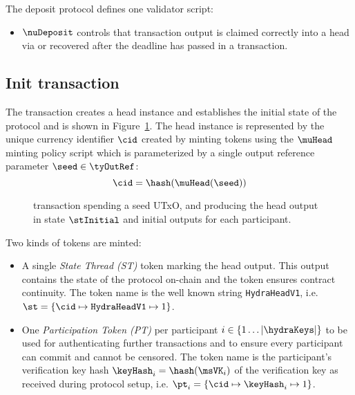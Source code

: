 \noindent The deposit protocol defines one validator script:
  \begin{itemize}
	\item $\nuDeposit$ controls that \mtxDeposit{} transaction output is
	claimed correctly into a head via \mtxIncrement{} or recovered after
	the deadline has passed in a \mtxRecover{} transaction.
  \end{itemize}

\subsection{Init transaction}\label{sec:init-tx}

The \mtxInit{} transaction creates a head instance and establishes the initial
state of the protocol and is shown in Figure~\ref{fig:initTx}. The head
instance is represented by the unique currency identifier $\cid$ created by
minting tokens using the $\muHead$ minting policy script which is parameterized
by a single output reference parameter $\seed \in \tyOutRef$:
\[
  \cid = \hash(\muHead(\seed))
\]

\begin{figure}
  \centering
  
  \caption{\mtxInit{} transaction spending a seed UTxO, and producing the head
	output in state $\stInitial$ and initial outputs for each participant.}\label{fig:initTx}
\end{figure}

\noindent Two kinds of tokens are minted:
\begin{itemize}
  \item A single \emph{State Thread (ST)} token marking the head output. This
  output contains the state of the protocol on-chain and the token ensures
  contract continuity. The token name is the well known string
  \texttt{HydraHeadV1}, i.e.
  $\st = \{\cid \mapsto \texttt{HydraHeadV1} \mapsto 1\}$.
  \item One \emph{Participation Token (PT)} per participant
  $i \in \{1 \dots |\hydraKeys|  \}$ to be used for authenticating further
  transactions and to ensure every participant can commit and cannot be
  censored. The token name is the participant's verification key hash
  $\keyHash_{i} = \hash(\msVK_{i})$ of the verification key as received
  during protocol setup, i.e.
  $\pt_{i} = \{\cid \mapsto \keyHash_{i} \mapsto 1\}$.
\end{itemize}

